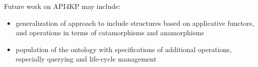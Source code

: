 \documentclass[runningheads]{llncs}
\begin{document}
Future work on API4KP may include:
\begin{itemize}
\item generalization of approach to include structures based on applicative functors, and
operations in terms of catamorphisms and anamorphisms
\item population of the ontology with specifications of additional operations, especially querying and life-cycle management
\end{itemize}


%
%




\end{document}
